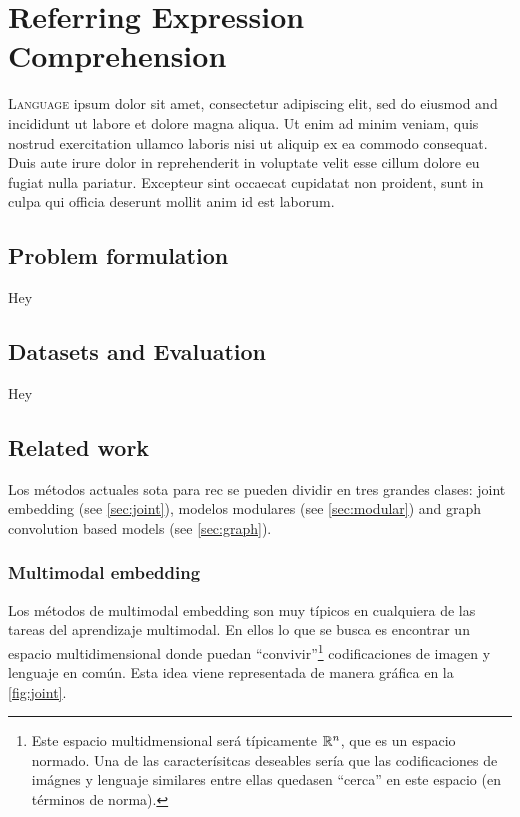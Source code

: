 

\chapter{Referring Expression Comprehension}



\lettrine{L}{anguage} ipsum dolor sit amet, consectetur
adipiscing elit, sed do eiusmod and incididunt ut labore et dolore magna
aliqua. Ut enim ad minim veniam, quis nostrud exercitation ullamco laboris nisi
ut aliquip ex ea commodo consequat. Duis aute irure dolor in reprehenderit in
voluptate velit esse cillum dolore eu fugiat nulla pariatur. Excepteur sint
occaecat cupidatat non proident, sunt in culpa qui officia deserunt mollit anim
id est laborum.


\section{Problem formulation}

Hey


\section{Datasets and Evaluation}

Hey


\section{Related work}

Los métodos actuales \gls{sota} para \gls{rec} se pueden dividir en tres
grandes clases: joint embedding (see \vref{sec:joint}), modelos modulares (see
\vref{sec:modular}) and graph convolution based models (see
\vref{sec:graph}).

\subsection{Multimodal embedding} \label{sec:joint}
Los métodos de multimodal embedding son muy típicos en cualquiera de las tareas del
aprendizaje multimodal. En ellos lo que se busca es encontrar un espacio
multidimensional donde puedan ``convivir''\footnote{Este espacio
multidmensional será típicamente \(\mathbb{R}^n\), que es un espacio normado. Una de
las caracterísitcas deseables sería que las codificaciones de imágnes y
lenguaje similares entre ellas quedasen ``cerca'' en este espacio (en términos
de norma).} codificaciones de imagen y lenguaje en común. Esta idea viene
representada de manera gráfica en la \vref{fig:joint}.

